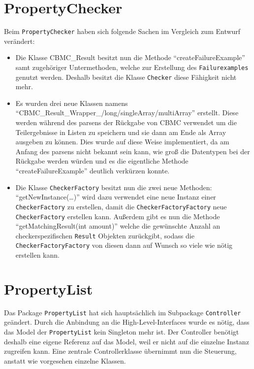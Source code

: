 \documentclass[a4paper]{scrreprt}
\begin{document}
\section{PropertyChecker}
Beim \verb!PropertyChecker! haben sich folgende Sachen im Vergleich zum Entwurf
verändert:
\begin{itemize}
\item Die Klasse CBMC\_Result besitzt nun die Methode ``createFailureExample''
  samt zugehöriger Untermethoden, welche zur Erstellung des \verb!Failurexamples!
  genutzt werden. Deshalb besitzt die Klasse \verb!Checker! diese Fähigkeit nicht mehr.

\item Es wurden drei neue Klassen namens
``CBMC\_Result\_Wrapper\_/long/singleArray/multiArray'' erstellt. Diese werden
während des parsens der Rückgabe von CBMC verwendet um die Teilergebnisse in
Listen zu speichern und sie dann am Ende als Array ausgeben zu können. Dies
wurde auf diese Weise implementiert, da am Anfang des parsens nicht bekannt
sein kann, wie groß die Datentypen bei der Rückgabe werden würden und es die
eigentliche Methode ``createFailureExample'' deutlich verkürzen konnte.

\item Die Klasse \verb!CheckerFactory! besitzt nun die zwei neue Methoden: \newline
``getNewInstance(\ldots)'' wird dazu verwendet eine neue Instanz einer
\verb!CheckerFactory! zu erstellen, damit die \verb!CheckerFactoryFactory! neue \verb!CheckerFactory!
erstellen kann. \newline Außerdem gibt es nun die Methode ``getMatchingResult(int
amount)'' welche die gewünschte Anzahl an checkerspezifischen \verb!Result! Objekten
zurückgibt, sodass die \verb!CheckerFactoryFactory! von diesen dann auf Wunsch so viele
wie nötig erstellen kann.

\end{itemize}


\section{PropertyList}

Das Package \verb!PropertyList! hat sich hauptsächlich im Subpackage \verb!Controller! geändert. Durch die Anbindung an die High-Level-Interfaces wurde es nötig, dass das Model der \verb!PropertyList! kein Singleton mehr ist. Der Controller benötigt deshalb eine eigene Referenz auf das Model, weil er nicht auf die einzelne Instanz zugreifen kann. Eine zentrale Controllerklasse übernimmt nun die Steuerung, anstatt wie vorgesehen einzelne Klassen.
\end{document}
